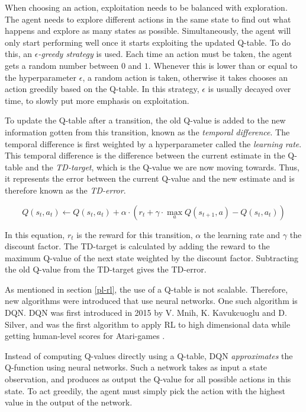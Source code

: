 When choosing an action, exploitation needs to be balanced with exploration. The agent needs to explore different actions in the same state to find out what happens and explore as many states as possible. Simultaneously, the agent will only start performing well once it starts exploiting the updated Q-table. To do this, an \emph{$\epsilon$-greedy strategy} is used. Each time an action must be taken, the agent gets a random number between $0$ and $1$. Whenever this is lower than or equal to the hyperparameter $\epsilon$, a random action is taken, otherwise it takes chooses an action greedily based on the Q-table. In this strategy, $\epsilon$ is usually decayed over time, to slowly put more emphasis on exploitation.

To update the Q-table after a transition, the old Q-value is added to the new information gotten from this transition, known as the \emph{temporal difference}. The temporal difference is first weighted by a hyperparameter called the \emph{learning rate}. This temporal difference is the difference between the current estimate in the Q-table and the \emph{TD-target}, which is the Q-value we are now moving towards. Thus, it represents the error between the current Q-value and the new estimate and is therefore known as the \emph{TD-error}.

\begin{equation}
Q(s_t,a_t) \leftarrow Q(s_t,a_t) + \alpha \cdot (r_t + \gamma \cdot \max _{a} Q(s_{t+1},a) - Q(s_t,a_t))
\end{equation}

In this equation, $r_t$ is the reward for this transition, $\alpha$ the learning rate and $\gamma$ the discount factor. The TD-target is calculated by adding the reward to the maximum Q-value of the next state weighted by the discount factor. Subtracting the old Q-value from the TD-target gives the TD-error. 

As mentioned in section \ref{pl-rl}, the use of a Q-table is not scalable. Therefore, new algorithms were introduced that use neural networks. One such algorithm is DQN. DQN was first introduced in 2015 by V. Mnih, K. Kavukcuoglu and D. Silver, and was the first algorithm to apply RL to high dimensional data while getting human-level scores for Atari-games \cite{dqn}.

Instead of computing Q-values directly using a Q-table, DQN \emph{approximates} the Q-function using neural networks. Such a network takes as input a state observation, and produces as output the Q-value for all possible actions in this state. To act greedily, the agent must simply pick the action with the highest value in the output of the network.

